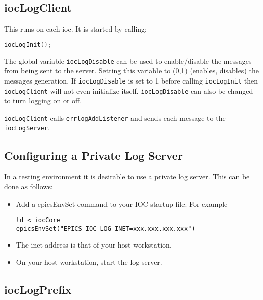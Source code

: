 \subsection{iocLogClient}
\label{iocLogClient}

This runs on each ioc.
It is started by calling:

\begin{lstlisting}[language=C]
iocLogInit();
\end{lstlisting}

The global variable \verb|iocLogDisable| can be used to enable/disable the messages from being sent to the server.
Setting this variable to (0,1) (enables, disables) the messages generation.
If \verb|iocLogDisable| is set to 1 before calling \verb|iocLogInit| then \verb|iocLogClient| will not even initialize itself.
\verb|iocLogDisable| can also be changed to turn logging on or off.

\verb|iocLogClient| calls \verb|errlogAddListener| and sends each message to the \verb|iocLogServer|.

\subsection{Configuring a Private Log Server}

In a testing environment it is desirable to use a private log server.
This can be done as follows:

\begin{itemize}

\item Add a epicsEnvSet command to your IOC startup file.
For example

\begin{verbatim}
ld < iocCore
epicsEnvSet("EPICS_IOC_LOG_INET=xxx.xxx.xxx.xxx")
\end{verbatim}

\item The inet address is that of your host workstation.

\item On your host workstation, start the log server.

\end{itemize}

\subsection{iocLogPrefix}
\label{iocLogPrefix}

